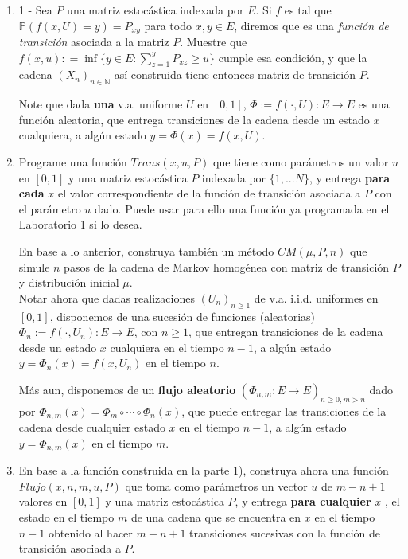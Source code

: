 \begin{enumerate}
    \item  1 - Sea $P$ una matriz estocástica  indexada por $E$. Si	$f$ es tal que $ \mathbb{P}(f(x,U)=y)= P_{xy} $ para todo $x,y\in E$, diremos que es una  \textit{función de transición} asociada a la matriz $P$. Muestre que $f(x,u): = \inf \{y\in E : \sum_{z=1}^y P_{xz}\geq u\}$ cumple esa condición, y que   la cadena $(X_n)_{n\in\mathbb{N}}$  así  construida tiene entonces matriz de transición $P$.

    Note que dada \textbf{una} v.a. uniforme $U$ en $[0,1]$, $\Phi:= f(\cdot,  U):E \rightarrow E$  es una función aleatoria,  que entrega transiciones de la cadena desde  un estado $x$ cualquiera, a algún estado $y=\Phi(x)= f(x,  U)$.  
				
    \item  Programe una función $Trans(x,u,P)$ que tiene  como parámetros un valor $u$  en $[0,1]$ y una matriz estocástica $P$ indexada por $\{1,...N\}$, y  entrega \textbf{para cada} $x$ el  valor correspondiente de la función de transición  asociada a $P$ con el parámetro $u$ dado.  Puede usar para ello una función ya programada en el Laboratorio 1 si lo desea.

    En base a lo anterior, construya  también  un método $CM(\mu,P,n)$ que simule $n$ pasos de la cadena de Markov homogénea con matriz de transición $P$ y distribución inicial $\mu$. 
    \vspace{.5cm}\\
    Notar ahora que  dadas realizaciones  $(U_{n})_{n\geq 1}$ de v.a.  i.i.d. uniformes en $[0,1]$,  disponemos de una sucesión  de funciones  (aleatorias) $\Phi_n:= f(\cdot,  U_n):E \rightarrow E$, con $n\geq 1$,   que entregan  transiciones de la cadena desde  un estado $x$ cualquiera en el tiempo $n-1$, a algún estado $y=\Phi_n (x)= f(x,  U_n)$  en el tiempo $n$.

    Más aun,   disponemos de un  \textbf{flujo aleatorio}  $(\Phi_{n,m} :E \rightarrow E )_{n\geq 0, m> n} $ dado por  $ \Phi_{n,m} (x)=  \Phi_{m} \circ \cdots \circ \Phi_n(x)$,   que puede  entregar  las transiciones de la cadena desde  cualquier estado $x$  en el tiempo $n-1$, a algún estado $y=\Phi_{n,m} (x)$  en el tiempo $m$.

    \item En base a la función construida en la parte 1),   construya ahora una función  $Flujo(x,n,m,u,P)$ que toma como parámetros  un vector  $u$  de $m-n+1$  valores en $[0,1]$ y una matriz estocástica  $P$, y entrega  \textbf{para cualquier} $x$ ,  el estado  en el tiempo $m$  de una cadena que se encuentra en $x$ en el tiempo $n-1$ obtenido al hacer $m-n+1$   transiciones sucesivas con la  función de transición  asociada a $P$. 
	

\end{enumerate}
